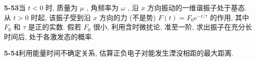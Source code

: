 \vfill

\newpage
\vfill

\noindent
\textbf{5-53}\quad 当 $t < 0$ 时, 质量为 $\mu$ , 角频率为 $\omega$ , 沿 $x$ 方向振动的一维谐振子处于基态. 从 $t > 0$ 时起, 该振子受到沿 $x$ 方向的力 (不是势) $F(t) = F_0 e^{-t / \tau}$ 的作用, 其中 $F_0$ 和 $\tau$ 是正的实数. 假若 $F_0$ 很小, 利用含时微扰论, 准至一阶, 求出振子在充分长时间后, 处于各激发态的概率.

\vfill

\newpage
\vfill

\noindent
\textbf{5-54}\quad 利用能量时间不确定关系, 估算正负电子对能发生湮没相距的最大距离.

\vfill

\newpage